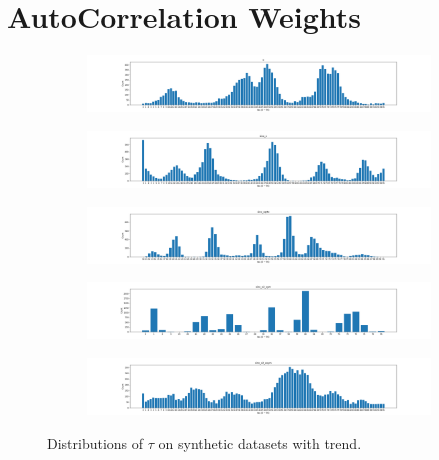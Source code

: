 \section{AutoCorrelation Weights}\label{app:tau}
\begin{figure}[ht]
    \centering
    \begin{subfigure}{\textwidth}
        \includegraphics[width=\textwidth]{img/tau_x.png}
    \end{subfigure}
    \begin{subfigure}{\textwidth}
        \includegraphics[width=\textwidth]{img/tau_sinx_x.png}
    \end{subfigure}
    \begin{subfigure}{\textwidth}
        \includegraphics[width=\textwidth]{img/tau_sinx_sqrtx.png}
    \end{subfigure}
    \begin{subfigure}{\textwidth}
        \includegraphics[width=\textwidth]{img/tau_sinx_x2_sym.png}
    \end{subfigure}
    \begin{subfigure}{\textwidth}
        \includegraphics[width=\textwidth]{img/tau_sinx_x2_asym.png}
    \end{subfigure}
    \caption{Distributions of $\tau$ on synthetic datasets with trend.}
\end{figure}

